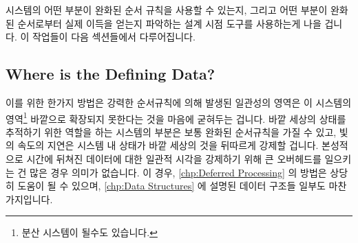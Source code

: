 \iffalse

One approach is to construct a strongly ordered system, then examine
its performance and scalablity.
If these suffice, the system is good and sufficient, and no more need
be done.
Otherwise, undertake careful analysis
(see \cref{sec:debugging:Performance Estimation})
and attack each bottleneck until the system's performance is good and
sufficient.

This approach can work very well, especially in contrast to the
all-too-common approach of optimizing random components of the system
in the hope of achieving significant system-wide benefits.
However, starting with strong ordering can also be quite wasteful,
given that weakening ordering of the system's bottleneck can require
that large portions of the rest of the system be redesigned and
rewritten to accommodate the weakening.
Worse yet, eliminating one bottleneck often exposes another, which
in turn needs to be weakened and which in turn can result in wholesale
redesigns and rewrites of other parts of the system.
Perhaps even worse is the approach, also common, of starting with a
fast but unreliable system and then playing whack-a-mole with an endless
succession of concurrency bugs, though in the latter case,
\cref{chp:Validation,chp:Formal Verification}
are always there for you.

\fi

시스템의 어떤 부분이 완화된 순서 규칙을 사용할 수 있는지, 그리고 어떤 부분이
완화된 순서로부터 실제 이득을 얻는지 파악하는 설계 시점 도구를 사용하는게 나을
겁니다.
이 작업들이 다음 섹션들에서 다루어집니다.

\iffalse

It would be better to have design-time tools to determine which portions
of the system could use weak ordering, and at the same time, which
portions actually benefit from weak ordering.
These tasks are taken up by the following sections.

\fi

\subsection{Where is the Defining Data?}
\label{sec:app:questions:Where is the Defining Data?}

이를 위한 한가지 방법은 강력한 순서규칙에 의해 발생된 일관성의 영역은 이
시스템의 영역\footnote{
	분산 시스템이 될수도 있습니다.}
바깥으로 확장되지 못한다는 것을 마음에 굳혀두는 겁니다.
바깥 세상의 상태를 추적하기 위한 역할을 하는 시스템의 부분은 보통 완화된
순서규칙을 가질 수 있고, 빛의 속도의 지연은 시스템 내 상태가 바깥 세상의 것을
뒤따르게 강제할 겁니다.
본성적으로 시간에 뒤쳐진 데이터에 대한 일관적 시각을 강제하기 위해 큰
오버헤드를 일으키는 건 많은 경우 의미가 없습니다.
이 경우, \cref{chp:Deferred Processing} 의 방법은 상당히 도움이 될 수 있으며,
\cref{chp:Data Structures} 에 설명된 데이터 구조들 일부도 마찬가지입니다.

